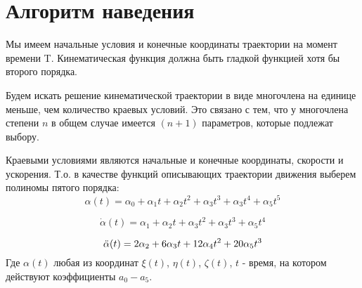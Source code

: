 \section{Алгоритм наведения}

Мы имеем начальные условия и конечные координаты траектории на момент времени T. Кинематическая функция должна быть гладкой функцией хотя бы второго порядка.

Будем искать решение кинематической траектории в виде многочлена на единице меньше, чем количество краевых условий. Это связано с тем, что у многочлена степени $n$ в общем случае имеется $(n + 1)$ параметров, которые подлежат выбору. 

Краевыми условиями являются начальные и конечные координаты, скорости и ускорения. Т.о. в качестве функций описывающих траектории движения выберем полиномы пятого порядка:
\begin{equation}
	\alpha(t) = \alpha_0 + \alpha_1 t + \alpha_2 t^2 + \alpha_3 t^3 + \alpha_3 t^4 + \alpha_5 t^5 
	\label{eq:ur_traectorii}
\end{equation}

\begin{equation}
	\Dot{\alpha}(t) = \alpha_1 + \alpha_2 t + \alpha_3 t^2 + \alpha_3 t^3 + \alpha_5 t^4 
	\label{eq:ur_velocity}
\end{equation}

\begin{equation}
	\Ddot{\alpha}(t) = 2 \alpha_2 + 6 \alpha_3 t + 12 \alpha_4 t^2 + 20 \alpha_5 t^3
\end{equation}
Где $\alpha(t)$ любая из координат $\xi(t)$, $\eta(t)$, $\zeta(t)$, $t$ - время, на котором действуют коэффициенты $a_0-a_5$. 

